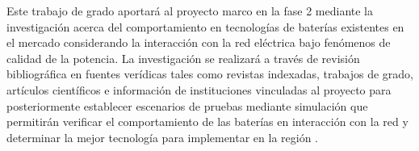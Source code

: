 Este trabajo de grado aportará al proyecto marco en la fase 2 mediante la investigación acerca del comportamiento en tecnologías de baterías existentes en el mercado considerando la  interacción con la red eléctrica bajo fenómenos de calidad de la potencia. La investigación se realizará a través de revisión bibliográfica en fuentes verídicas tales como revistas indexadas, trabajos de grado, artículos científicos e información de instituciones vinculadas al proyecto para posteriormente establecer escenarios de pruebas mediante simulación que permitirán verificar el comportamiento de las baterías en interacción con la red y determinar la mejor tecnología para implementar en la región .